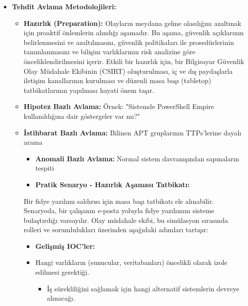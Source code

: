 \begin{itemize}

    \item \textbf{Tehdit Avlama Metodolojileri:}\begin{itemize}

    \begin{itemize}    \item \textbf{Hazırlık (Preparation):} Olayların meydana gelme olasılığını azaltmak için proaktif önlemlerin alındığı aşamadır. Bu aşama, güvenlik açıklarının belirlenmesini ve azaltılmasını, güvenlik politikaları ile prosedürlerinin tanımlanmasını ve bilişim varlıklarının risk analizine göre önceliklendirilmesini içerir. Etkili bir hazırlık için, bir Bilgisayar Güvenlik Olay Müdahale Ekibinin (CSIRT) oluşturulması, iç ve dış paydaşlarla iletişim kanallarının kurulması ve düzenli masa başı (tabletop) tatbikatlarının yapılması hayati önem taşır.

        \item \textbf{Hipotez Bazlı Avlama:} Örnek: "Sistemde PowerShell Empire kullanıldığına dair göstergeler var mı?"

        \item \textbf{İstihbarat Bazlı Avlama:} Bilinen APT gruplarının TTPs'lerine dayalı arama    \begin{itemize}

        \item \textbf{Anomali Bazlı Avlama:} Normal sistem davranışından sapmaların tespiti        \item \textbf{Pratik Senaryo - Hazırlık Aşaması Tatbikatı:}

    \end{itemize}        Bir fidye yazılımı saldırısı için masa başı tatbikatı ele alınabilir. Senaryoda, bir çalışanın e-posta yoluyla fidye yazılımını sisteme bulaştırdığı varsayılır. Olay müdahale ekibi, bu simülasyon sırasında rolleri ve sorumlulukları üzerinden aşağıdaki adımları tartışır:

            \begin{itemize}

    \item \textbf{Gelişmiş IOC'ler:}            \item Hangi varlıkların (sunucular, veritabanları) öncelikli olarak izole edilmesi gerektiği.

    \begin{itemize}            \item İş sürekliliğini sağlamak için hangi alternatif sistemlerin devreye alınacağı.


\end{itemize}
\end{itemize}
\end{itemize}
\end{itemize}
\end{itemize}
